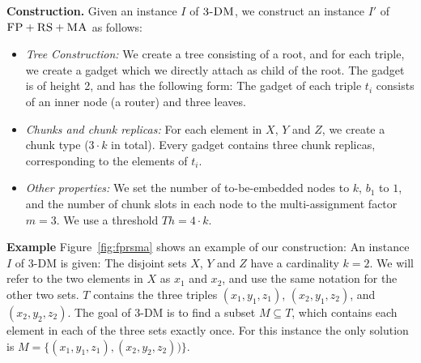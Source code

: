 \documentclass[9pt]{sigcomm-alternate}
\newcommand{\maciek}[1]{\textcolor{brown}{maciek: #1}}
\newcommand{\stefan}[1]{\textcolor{blue}{stefan: #1}}
\newcommand{\MaFactor}{m}
\newcommand{\FP}{\textsc{FP}}
\newcommand{\RS}{\textsc{RS}}
\newcommand{\MA}{\textsc{MA}}
\newcommand{\CostTrans}{\ensuremath{b_1}}
\newcommand{\TDM}{\textsc{3-DM}}
\newcommand{\Thr}{\ensuremath{Th}}
\begin{document}
\textbf{Construction.}
Given an instance $I$ of $\TDM$, we construct an instance $I'$ of
$\FP+\RS+\MA$ as follows:
\begin{itemize}
\item \emph{Tree Construction:} We create a tree consisting of a root,
and for each triple, we create a gadget which we directly attach as
child of the root. The gadget is of height 2,
and has the following form:
The gadget of each triple $t_i$ consists of an inner node (a router) and three leaves.
\item \emph{Chunks and chunk replicas:} For each element in $X$, $Y$ and $Z$,
 we create a chunk type
($3 \cdot k$ in total). Every gadget
contains three chunk replicas, corresponding to the elements of $t_i$.
\item \emph{Other properties:} We set the number of to-be-embedded nodes to $k$,
$\CostTrans$ to $1$, and the number of chunk slots in each node to the multi-assignment factor
$\MaFactor=3$.
We use a threshold $\Thr= 4
\cdot k$.
\end{itemize}

\textbf{Example} Figure~\ref{fig:fprsma} shows an example of our construction: An
instance $I$ of 3-DM is given: The disjoint sets $X$, $Y$ and $Z$ have a
cardinality $k=2$. We will refer to the two elements in $X$ as $x_1$ and $x_2$,
and use the same notation for the other two sets. $T$ contains the three triples
$(x_1, y_1,
z_1)$, $(x_2, y_1, z_2)$, and $(x_2, y_2, z_2)$. The goal of 3-DM is to find a
subset $M \subseteq T$, which contains each element in each of the three sets
exactly once. For this instance the only solution is $M =
\{(x_1,y_1,z_1),(x_2,y_2,z_2))\}$.
\end{document}
